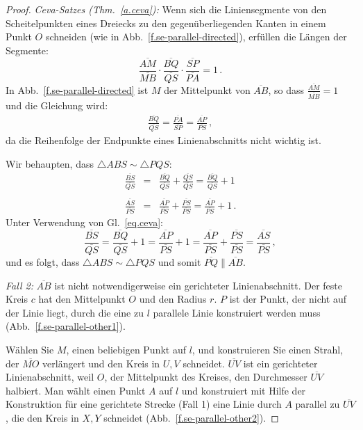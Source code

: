\begin{proof}
\textit{Ceva-Satzes (Thm.~\ref{a.ceva}):} Wenn sich die Liniensegmente von den Scheitelpunkten eines Dreiecks zu den gegenüberliegenden Kanten in einem Punkt $O$ schneiden (wie in Abb.~\ref{f.se-parallel-directed}), erfüllen die Längen der Segmente:
\[
\frac{\overline{AM}}{\overline{MB}}\cdot\frac{\overline{BQ}}{\overline{QS}}\cdot\frac{\overline{SP}}{\overline{PA}} = 1\,.
\]
In Abb.~\ref{f.se-parallel-directed} ist $M$ der Mittelpunkt von $\overline{AB}$, so dass $\displaystyle\frac{\overline{AM}}{\overline{MB}}=1$ und die Gleichung wird:
\begin{align}
\frac{\overline{BQ}}{\overline{QS}}=\frac{\overline{PA}}{\overline{SP}}=\frac{\overline{AP}}{\overline{PS}}\,,\label{eq.ceva}
\end{align}
da die Reihenfolge der Endpunkte eines Linienabschnitts nicht wichtig ist.

Wir behaupten, dass $\triangle ABS \sim \triangle PQS$:
\begin{eqnarray*}
\frac{\overline{BS}}{\overline{QS}}&=&\frac{\overline{BQ}}{\overline{QS}}+\frac{\overline{QS}}{\overline{QS}} = \frac{\overline{BQ}}{\overline{QS}}+1\\
&&\\
\frac{\overline{AS}}{\overline{PS}} &=& \frac{\overline{AP}}{\overline{PS}} + \frac{\overline{PS}}{\overline{PS}} = \frac{\overline{AP}}{\overline{PS}} + 1\,.
\end{eqnarray*}
Unter Verwendung von Gl.~\ref{eq.ceva}:
\[
\frac{\overline{BS}}{\overline{QS}}=\frac{\overline{BQ}}{\overline{QS}}+1=\frac{\overline{AP}}{\overline{PS}}+1=\frac{\overline{AP}}{\overline{PS}}+\frac{\overline{PS}}{\overline{PS}}=\frac{\overline{AS}}{\overline{PS}}\,,
\]
und es folgt, dass $\triangle ABS \sim \triangle PQS$ und somit $\overline{PQ}\parallel\overline{AB}$.

\textit{Fall 2:}
$\overline{AB}$ ist nicht notwendigerweise ein gerichteter Linienabschnitt. Der feste Kreis $c$ hat den Mittelpunkt $O$ und den Radius $r$. $P$ ist der Punkt, der nicht auf der Linie liegt, durch die eine zu $l$ parallele Linie konstruiert werden muss (Abb.~\ref{f.se-parallel-other1}).

Wählen Sie $M$, einen beliebigen Punkt auf $l$, und konstruieren Sie einen Strahl, der $\overline{MO}$ verlängert und den Kreis in $U,V$ schneidet.
$\overline{UV}$ ist ein gerichteter Linienabschnitt, weil $O$, der Mittelpunkt des Kreises, den Durchmesser $\overline{UV}$ halbiert. Man wählt einen Punkt $A$ auf $l$ und konstruiert mit Hilfe der Konstruktion für eine gerichtete Strecke (Fall 1) eine Linie durch $A$ parallel zu $\overline{UV}$, die den Kreis in $X,Y$ schneidet (Abb.~\ref{f.se-parallel-other2}).


\end{proof}
